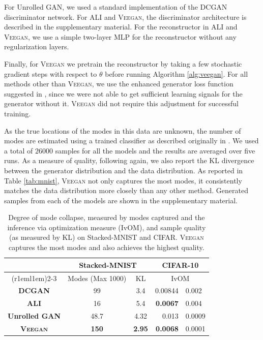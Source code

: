 \documentclass{article}
\newcommand{\acronym}{\textsc{Veegan}\xspace}
\begin{document}
For Unrolled GAN, we used a standard implementation of the DCGAN discriminator network. For  ALI and \acronym, the discriminator 
architecture is described
in the supplementary material. 
For the reconstructor in ALI and \acronym,
we use a simple two-layer MLP for the reconstructor without any regularization layers. 

Finally, for \acronym we  pretrain the reconstructor by taking a few 
stochastic gradient steps with respect to $\theta$ before running Algorithm
\ref{alg:veegan}. For all methods other than \acronym, 
we use the enhanced generator loss function suggested in \citep{gan}, since we were not able to get sufficient learning signals for the generator without it.
\acronym did not require this adjustment for successful training.

As the true locations of the modes in this data 
are unknown, 
the number of modes are estimated using a trained classifier as described originally in \citep{Che2017ModeRG}. We used a total of $26000$ samples for all the models and the results are averaged over five runs. As a measure of quality, 
following \citep{metz2016unrolled} again, we also report the KL divergence between the generator distribution and the data distribution.
As reported in Table \ref{tab:mnist}, \acronym  not only  captures the most  modes, it  consistently matches the data distribution more closely than any other method. Generated samples from each of the models are shown in the supplementary material.

\begin{table}%
\centering
\begin{tabular}{@{}ccc|r@{ $\pm$ }l@{}}\toprule
\multicolumn{1}{l}{\multirow{2}{*}{}} & \multicolumn{2}{c}{\textbf{Stacked-MNIST}} & \multicolumn{2}{c}{\textbf{CIFAR-10}}                                  \\   \cmidrule(r{1em}l{1em}){2-3} 
               & {Modes (Max 1000)} & \multicolumn{1}{c}{KL} & \multicolumn{2}{c}{{IvOM}}                                \\ \midrule
\textbf{DCGAN}                          & 99                    & 3.4   & 0.00844 & 0.002       \\ 
\textbf{ALI}                            & 16                        & 5.4 & \textbf{0.0067} & 0.004                                                  \\ 
\textbf{Unrolled GAN}                   & 48.7                       & 4.32  & 0.013 & 0.0009                                                     \\
\textbf{\acronym}                       & \textbf{150}             & \textbf{2.95}      & \textbf{0.0068} & 0.0001                                    \\ \bottomrule
\end{tabular} \vspace{1ex}
\caption{Degree of mode collapse, measured by modes captured and the inference via optimization measure (IvOM), and sample quality (as measured by KL)
on Stacked-MNIST and CIFAR.  \acronym captures the most modes and also achieves the highest quality.}
\label{tab:mnist}
\label{tab:cifar}
\end{table}
\end{document}
